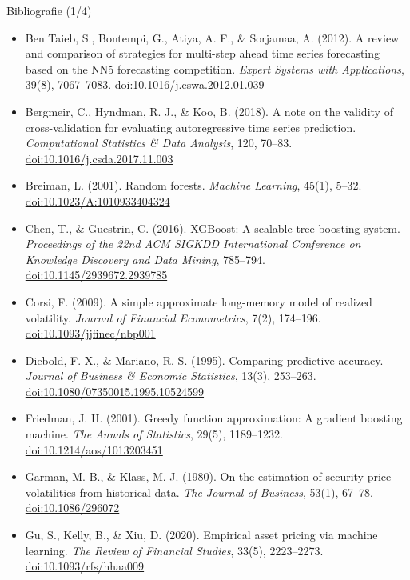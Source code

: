\begin{frame}{Bibliografie (1/4)}
\itemsize{\scriptsize}
\begin{itemize}
    \item Ben Taieb, S., Bontempi, G., Atiya, A. F., \& Sorjamaa, A. (2012). A review and comparison of strategies for multi-step ahead time series forecasting based on the NN5 forecasting competition. \textit{Expert Systems with Applications}, 39(8), 7067--7083. \href{https://doi.org/10.1016/j.eswa.2012.01.039}{doi:10.1016/j.eswa.2012.01.039}
    \item Bergmeir, C., Hyndman, R. J., \& Koo, B. (2018). A note on the validity of cross-validation for evaluating autoregressive time series prediction. \textit{Computational Statistics \& Data Analysis}, 120, 70--83. \href{https://doi.org/10.1016/j.csda.2017.11.003}{doi:10.1016/j.csda.2017.11.003}
    \item Breiman, L. (2001). Random forests. \textit{Machine Learning}, 45(1), 5--32. \href{https://doi.org/10.1023/A:1010933404324}{doi:10.1023/A:1010933404324}
    \item Chen, T., \& Guestrin, C. (2016). XGBoost: A scalable tree boosting system. \textit{Proceedings of the 22nd ACM SIGKDD International Conference on Knowledge Discovery and Data Mining}, 785--794. \href{https://doi.org/10.1145/2939672.2939785}{doi:10.1145/2939672.2939785}
    \item Corsi, F. (2009). A simple approximate long-memory model of realized volatility. \textit{Journal of Financial Econometrics}, 7(2), 174--196. \href{https://doi.org/10.1093/jjfinec/nbp001}{doi:10.1093/jjfinec/nbp001}
    \item Diebold, F. X., \& Mariano, R. S. (1995). Comparing predictive accuracy. \textit{Journal of Business \& Economic Statistics}, 13(3), 253--263. \href{https://doi.org/10.1080/07350015.1995.10524599}{doi:10.1080/07350015.1995.10524599}
    \item Friedman, J. H. (2001). Greedy function approximation: A gradient boosting machine. \textit{The Annals of Statistics}, 29(5), 1189--1232. \href{https://doi.org/10.1214/aos/1013203451}{doi:10.1214/aos/1013203451}
    \item Garman, M. B., \& Klass, M. J. (1980). On the estimation of security price volatilities from historical data. \textit{The Journal of Business}, 53(1), 67--78. \href{https://doi.org/10.1086/296072}{doi:10.1086/296072}
    \item Gu, S., Kelly, B., \& Xiu, D. (2020). Empirical asset pricing via machine learning. \textit{The Review of Financial Studies}, 33(5), 2223--2273. \href{https://doi.org/10.1093/rfs/hhaa009}{doi:10.1093/rfs/hhaa009}
\end{itemize}
\end{frame}

